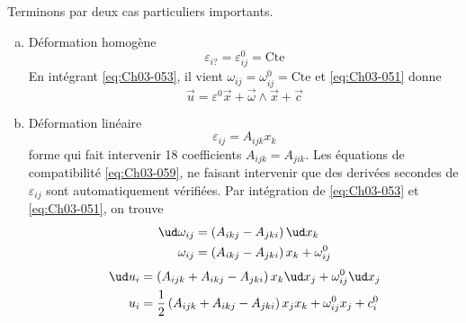 Terminons par deux cas particuliers importants.
\begin{enumerate}[(a)]
    \item Déformation homogène
        \begin{equation}
            \varepsilon_{i?} = \varepsilon_{ij}^0 = \text{Cte}
            \label{eq:Ch03-061}
        \end{equation}
        En intégrant \eqref{eq:Ch03-053}, il vient $\omega_{ij} = \omega_{ij}^0 = \text{Cte}$ et \eqref{eq:Ch03-051} donne
        \begin{equation}
            \vec{u} = \mathbb{\varepsilon}^0 \vec{x} + \vec{\omega} \wedge \vec{x} + \vec{c}
            \label{eq:Ch03-062}
        \end{equation}
    \item Déformation linéaire
        \begin{equation}
            \varepsilon_{ij} = A_{ijk} x_k
            \label{eq:Ch03-063}
        \end{equation}
        forme qui fait intervenir 18 coefficients $A_{ijk} = A_{jik}$.
        Les équations de compatibilité \eqref{eq:Ch03-059}, ne faisant intervenir que des derivées secondes de $\varepsilon_{ij}$ sont automatiquement vérifiées.
        Par intégration de \eqref{eq:Ch03-053} et \eqref{eq:Ch03-051}, on trouve
        \begin{equation}
            \begin{aligned}
                \ud \omega_{ij} &= \left( A_{ikj} - A_{jki} \right) \ud x_k \\
                \omega_{ij} &= \left( A_{ikj} - A_{jki} \right) x_k + \omega_{ij}^0
            \end{aligned}
            \label{eq:Ch03-064}
        \end{equation}
        \begin{equation}
            \begin{aligned}
                \ud u_i &= \left( A_{ijk} + A_{ikj} - A_{jki} \right) x_k \ud x_j + \omega_{ij}^0 \ud x_j \\
                u_i &= \frac{1}{2} \left( A_{ijk} + A_{ikj} - A_{jki} \right) x_j x_k + \omega_{ij}^0 x_j + c_i^0
            \end{aligned}
            \label{eq:Ch03-065}
        \end{equation}
\end{enumerate}
